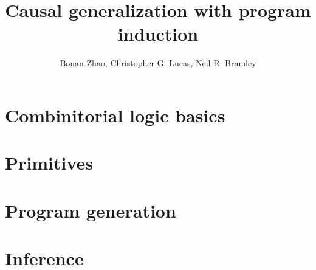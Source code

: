 \documentclass{article}
\title{Causal generalization with program induction}
\author{Bonan Zhao, Christopher G. Lucas, Neil R. Bramley}
\begin{document}
\maketitle


\section{Combinitorial logic basics}


\section{Primitives}


\section{Program generation}


\section{Inference}






\end{document}
